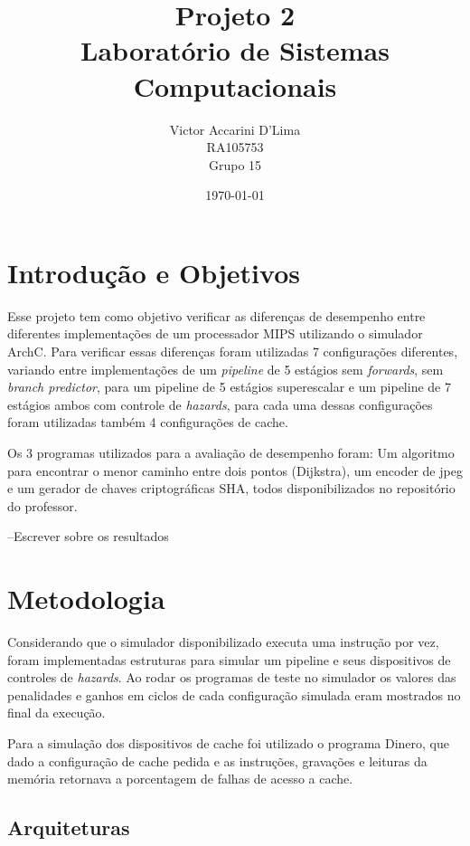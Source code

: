 \documentclass[pdftex,12pt,a4paper]{article}
\begin{document}
\title{Projeto 2\\Laboratório de Sistemas Computacionais}
\author{Victor Accarini D'Lima\\RA105753\\Grupo 15}
\date{\today}
\maketitle

\bigskip

\section{Introdução e Objetivos}
Esse projeto tem como objetivo verificar as diferenças de desempenho entre 
diferentes implementações de um processador MIPS utilizando o simulador ArchC. 
Para verificar essas diferenças foram utilizadas 7 configurações diferentes, 
variando entre implementações de um \textit{pipeline} de 5 estágios sem 
\textit{forwards}, sem \textit{branch predictor}, para um pipeline de 5 estágios 
superescalar e um pipeline de 7 estágios ambos com controle de \textit{hazards}, 
para cada uma dessas configurações foram utilizadas também 4 configurações de cache.

Os 3 programas utilizados para a avaliação de desempenho foram: Um algoritmo para 
encontrar o menor caminho entre dois pontos (Dijkstra), um encoder de jpeg e um 
gerador de chaves criptográficas SHA, todos disponibilizados no repositório do 
professor.

--Escrever sobre os resultados

\section{Metodologia}
Considerando que o simulador disponibilizado executa uma instrução por vez, 
foram implementadas estruturas para simular um pipeline e seus dispositivos 
de controles de \textit{hazards}. Ao rodar os programas de teste no simulador 
os valores das penalidades e ganhos em ciclos de cada configuração simulada 
eram mostrados no final da execução.

Para a simulação dos dispositivos de cache foi utilizado o programa Dinero, 
que dado a configuração de cache pedida e as instruções, gravações e leituras 
da memória retornava a porcentagem de falhas de acesso a cache.

\subsection{Arquiteturas}
\end{document}
